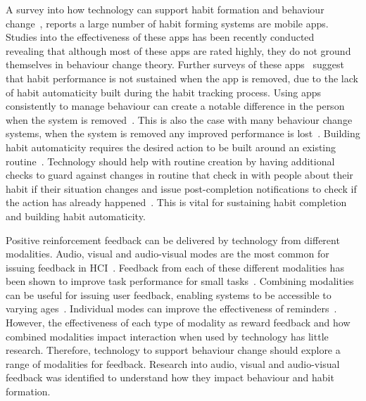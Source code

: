 \documentclass{scaffold/sigchi}
\begin{document}
A survey into how technology can support habit formation and behaviour change~\cite{survey_on_current_apps_of_steel}, reports a large number of habit forming systems are mobile apps. Studies into the effectiveness of these apps has been recently conducted~\cite{article_beyond_self_tracking_designing_apps, article_dont_kick_habit} revealing that although most of these apps are rated highly, they do not ground themselves in behaviour change theory. Further surveys of these apps~\cite{survey_on_apps_2} suggest that habit performance is not sustained when the app is removed, due to the lack of habit automaticity built during the habit tracking process. Using apps consistently to manage behaviour can create a notable difference in the person when the system is removed~\cite{article_my_phone_is_part_of_my_soul}.
This is also the case with many behaviour change systems, when the system is removed any improved performance is lost~\cite{article_dont_kick_habit, article_realtime_feedback_improving_medication_taking}. Building habit automaticity requires the desired action to be built around an existing routine~\cite{article_how_habits_formed_modelling_habit_formation, article_implementation_intentions_multicue}. Technology should help with routine creation by having additional checks to guard against changes in routine that check in with people about their habit if their situation changes and issue post-completion notifications to check if the action has already happened~\cite{article_dont_forget_your_pill}. This is vital for sustaining habit completion and building habit automaticity.

Positive reinforcement feedback can be delivered by technology from different modalities. Audio, visual and audio-visual modes are the most common for issuing feedback in HCI~\cite{desinging_interface_speech_tech}. Feedback from each of these different modalities has been shown to improve task performance for small tasks~\cite{chi_oussama_tap_the_shapetones}. Combining modalities can be useful for issuing user feedback, enabling systems to be accessible to varying ages~\cite{article_user_centred_multimodal_reminders}. Individual modes can improve the effectiveness of reminders~\cite{multi_modal_reminders_less_disruptive, article_designing_multimodal_reminders_for_home}. However, the effectiveness of each type of modality as reward feedback and how combined modalities impact interaction when used by technology has little research. Therefore, technology to support behaviour change should explore a range of modalities for feedback. Research into audio, visual and audio-visual feedback was identified to understand how they impact behaviour and habit formation.
\end{document}
